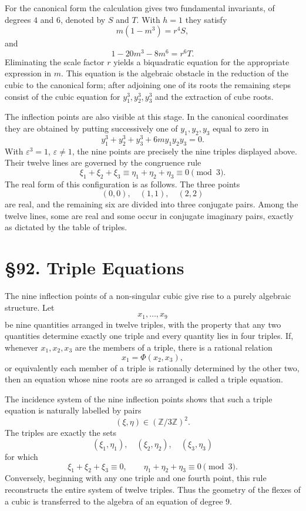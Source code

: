 \documentclass[11pt,a4paper]{book}
\newcommand{\webersection}[2]{\clearpage\section*{\S #1. #2}}
\begin{document}
For the canonical form the calculation gives two fundamental invariants, of degrees \(4\) and \(6\), denoted by \(S\) and \(T\).  With \(h=1\) they satisfy
\[
m(1-m^3)=r^4S,
\]
and
\[
1-20m^3-8m^6=r^6T.
\]
Eliminating the scale factor \(r\) yields a biquadratic equation for the appropriate expression in \(m\).  This equation is the algebraic obstacle in the reduction of the cubic to the canonical form; after adjoining one of its roots the remaining steps consist of the cubic equation for \(y_1^3,y_2^3,y_3^3\) and the extraction of cube roots.

The inflection points are also visible at this stage.  In the canonical coordinates they are obtained by putting successively one of \(y_1,y_2,y_3\) equal to zero in
\[
y_1^3+y_2^3+y_3^3+6my_1y_2y_3=0.
\]
With \(\varepsilon^3=1\), \(\varepsilon\ne1\), the nine points are precisely the nine triples displayed above.  Their twelve lines are governed by the congruence rule
\[
\xi_1+\xi_2+\xi_3\equiv
\eta_1+\eta_2+\eta_3\equiv0\pmod3.
\]
The real form of this configuration is as follows.  The three points
\[
(0,0),\quad(1,1),\quad(2,2)
\]
are real, and the remaining six are divided into three conjugate pairs.  Among the twelve lines, some are real and some occur in conjugate imaginary pairs, exactly as dictated by the table of triples.

\webersection{92}{Triple Equations}

The nine inflection points of a non-singular cubic give rise to a purely algebraic structure.  Let
\[
x_1,\dots,x_9
\]
be nine quantities arranged in twelve triples, with the property that any two quantities determine exactly one triple and every quantity lies in four triples.  If, whenever \(x_1,x_2,x_3\) are the members of a triple, there is a rational relation
\[
x_1=\Phi(x_2,x_3),
\]
or equivalently each member of a triple is rationally determined by the other two, then an equation whose nine roots are so arranged is called a triple equation.

The incidence system of the nine inflection points shows that such a triple equation is naturally labelled by pairs
\[
(\xi,\eta)\in(\mathbb Z/3\mathbb Z)^2.
\]
The triples are exactly the sets
\[
(\xi_1,\eta_1),\quad(\xi_2,\eta_2),\quad(\xi_3,\eta_3)
\]
for which
\[
\xi_1+\xi_2+\xi_3\equiv0,\qquad
\eta_1+\eta_2+\eta_3\equiv0\pmod3.
\]
Conversely, beginning with any one triple and one fourth point, this rule reconstructs the entire system of twelve triples.  Thus the geometry of the flexes of a cubic is transferred to the algebra of an equation of degree \(9\).
\end{document}
